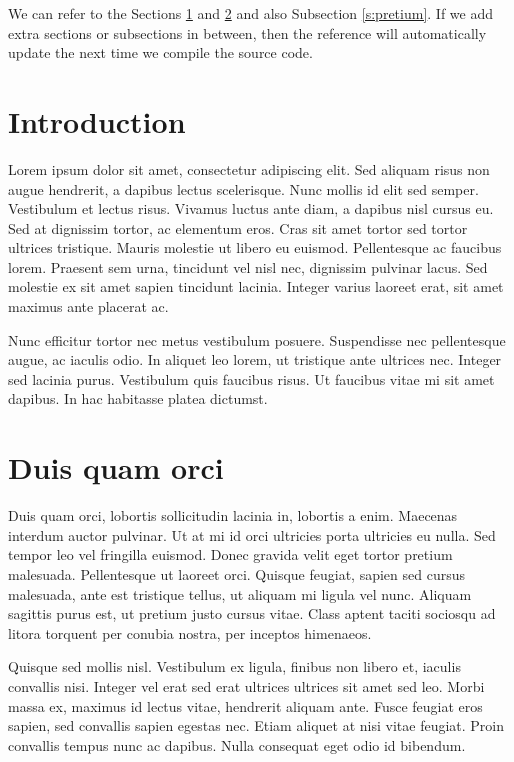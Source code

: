 \documentclass[a4paper,10pt]{article}
\begin{document}
We can refer to the Sections \ref{s:intro} and \ref{s:duis} and also Subsection \ref{s:pretium}.
If we add extra sections or subsections in between, then the reference will automatically
update the next time we compile the source code.

\section{Introduction}
\label{s:intro}

Lorem ipsum dolor sit amet, consectetur adipiscing elit. Sed aliquam risus non augue hendrerit, a dapibus lectus
scelerisque. Nunc mollis id elit sed semper. Vestibulum et lectus risus. Vivamus luctus ante diam, a dapibus nisl
cursus eu. Sed at dignissim tortor, ac elementum eros. Cras sit amet tortor sed tortor ultrices tristique.
Mauris molestie ut libero eu euismod. Pellentesque ac faucibus lorem. Praesent sem urna, tincidunt vel nisl nec,
dignissim pulvinar lacus. Sed molestie ex sit amet sapien tincidunt lacinia. Integer varius laoreet erat, sit
amet maximus ante placerat ac.

Nunc efficitur tortor nec metus vestibulum posuere. Suspendisse nec pellentesque augue, ac iaculis odio.
In aliquet leo lorem, ut tristique ante ultrices nec. Integer sed lacinia purus. Vestibulum quis faucibus risus.
Ut faucibus vitae mi sit amet dapibus. In hac habitasse platea dictumst.

\section{Duis quam orci}
\label{s:duis}

Duis quam orci, lobortis sollicitudin lacinia in, lobortis a enim. Maecenas interdum auctor pulvinar.
Ut at mi id orci ultricies porta ultricies eu nulla. Sed tempor leo vel fringilla euismod. Donec gravida velit
eget tortor pretium malesuada. Pellentesque ut laoreet orci. Quisque feugiat, sapien sed cursus malesuada,
ante est tristique tellus, ut aliquam mi ligula vel nunc. Aliquam sagittis purus est, ut pretium justo cursus vitae.
Class aptent taciti sociosqu ad litora torquent per conubia nostra, per inceptos himenaeos.

Quisque sed mollis nisl. Vestibulum ex ligula, finibus non libero et, iaculis convallis nisi.
Integer vel erat sed erat ultrices ultrices sit amet sed leo. Morbi massa ex, maximus id lectus vitae,
hendrerit aliquam ante. Fusce feugiat eros sapien, sed convallis sapien egestas nec. Etiam aliquet at
nisi vitae feugiat. Proin convallis tempus nunc ac dapibus. Nulla consequat eget odio id bibendum.
\end{document}
